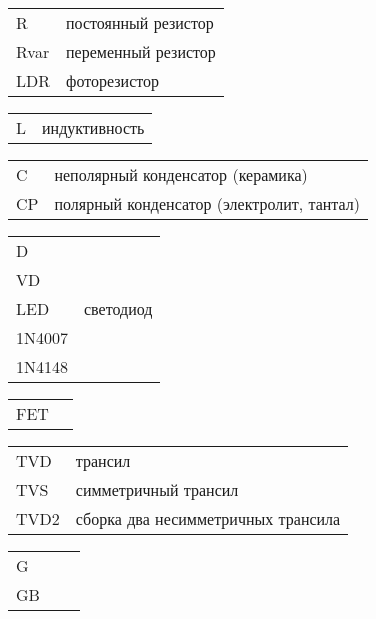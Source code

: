 \secdown

\secdown


\begin{tabular}{l l}
R & постоянный резистор \\
Rvar & переменный резистор \\
LDR & фоторезистор \\
\end{tabular}


\begin{tabular}{l l}
L & индуктивность \\
\end{tabular}


\begin{tabular}{l l}
C & неполярный конденсатор (керамика) \\
CP & полярный конденсатор (электролит, тантал) \\
\end{tabular}


\begin{tabular}{l l}
D \\
VD \\
LED & светодиод \\
1N4007 \\
1N4148 \\
\end{tabular}


\begin{tabular}{l l}
FET \\
\end{tabular}


\begin{tabular}{l l}
TVD & трансил \\
TVS & симметричный трансил \\
TVD2 & сборка два несимметричных трансила \\
\end{tabular}


\begin{tabular}{l l l}
G \\
GB \\
\end{tabular}

